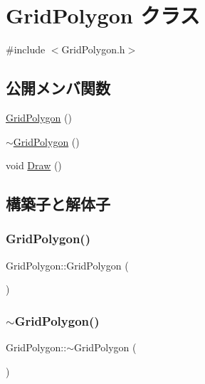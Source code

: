 \hypertarget{class_grid_polygon}{}\section{Grid\+Polygon クラス}
\label{class_grid_polygon}


{\ttfamily \#include $<$Grid\+Polygon.\+h$>$}

\subsection*{公開メンバ関数}
\begin{DoxyCompactItemize}
\item 
\mbox{\hyperlink{class_grid_polygon_a4fdbbc978d24c751b07c6803eb53075e}{Grid\+Polygon}} ()
\item 
\mbox{\hyperlink{class_grid_polygon_a25fbe0d5c2682a1174dda7d29f6ddf74}{$\sim$\+Grid\+Polygon}} ()
\item 
void \mbox{\hyperlink{class_grid_polygon_a93a672fb9d5b6757c132fba8792f5459}{Draw}} ()
\end{DoxyCompactItemize}


\subsection{構築子と解体子}
\mbox{\label{class_grid_polygon_a4fdbbc978d24c751b07c6803eb53075e}} 
\subsubsection{\texorpdfstring{Grid\+Polygon()}{GridPolygon()}}
{\footnotesize\ttfamily Grid\+Polygon\+::\+Grid\+Polygon (\begin{DoxyParamCaption}{ }\end{DoxyParamCaption})}

\mbox{\label{class_grid_polygon_a25fbe0d5c2682a1174dda7d29f6ddf74}} 
\subsubsection{\texorpdfstring{$\sim$\+Grid\+Polygon()}{~GridPolygon()}}
{\footnotesize\ttfamily Grid\+Polygon\+::$\sim$\+Grid\+Polygon (\begin{DoxyParamCaption}{ }\end{DoxyParamCaption})}



